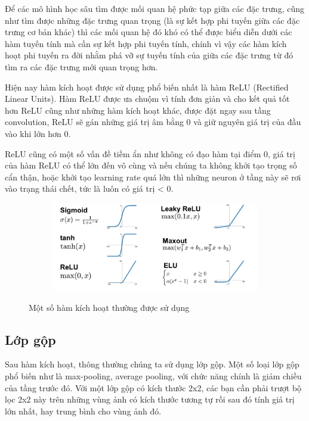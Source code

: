 Để các mô hình học sâu tìm được mối quan hệ phức tạp giữa các đặc trưng, cũng như tìm được những đặc trưng quan trọng
(là sự kết hợp phi tuyến giữa các đặc trưng cơ bản khác) thì các mối quan hệ đó khó có thể được biểu diễn dưới các hàm tuyến tính
mà cần sự kết hợp phi tuyến tính, chính vì vậy các hàm kích hoạt phi tuyến ra đời nhằm phá vỡ sự tuyến tính của giữa các đặc trưng từ đó tìm
ra các đặc trưng mới quan trọng hơn.

Hiện nay hàm kích hoạt được sử dụng phổ biến nhất là hàm ReLU (Rectified Linear Units). Hàm ReLU được ưa chuộm vì tính đơn giản và cho kết quả tốt hơn
ReLU cũng như những hàm kích hoạt khác, được đặt ngay sau tầng convolution, ReLU sẽ gán những giá trị âm bằng 0 và giữ nguyên giá trị của đầu vào khi lớn hơn 0.

ReLU cũng có một số vấn đề tiềm ẩn như không có đạo hàm tại điểm 0, giá trị của hàm ReLU có thể lớn đến vô cùng và
nếu chúng ta không khởi tạo trọng số cẩn thận, hoặc khởi tạo learning rate quá lớn thì những neuron ở tầng này sẽ rơi vào trạng thái chết, tức là luôn có giá trị < 0.

\begin{figure}
    \begin{subfigure}{1.\textwidth}
        \begin{center}
            \includegraphics[width=1.\linewidth]{Chapters/items/chap2_6.jpg}
        \end{center}
        \label{fig:chap2_6}
    \end{subfigure}
    \caption{Một số hàm kích hoạt thường được sử dụng}
\end{figure}

\newpage
\subsection{Lớp gộp}

Sau hàm kích hoạt, thông thường chúng ta sử dụng lớp gộp. Một số loại lớp gộp phổ biến như là max-pooling, average pooling,
với chức năng chính là giảm chiều của tầng trước đó. Với một lớp gộp có kích thước 2x2,
các bạn cần phải trượt bộ lọc 2x2 này trên những vùng ảnh có kích thước tương tự rồi sau đó tính giá trị lớn nhất,
hay trung bình cho vùng ảnh đó.

